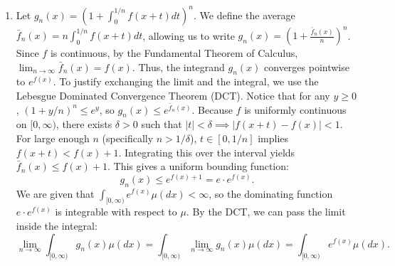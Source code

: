 \documentclass[10pt,a4paper]{article}
\begin{document}
\begin{enumerate}[label=\fbox{\arabic*}]
\begin{enumerate}[label=(\arabic*)]
          \item Now we compute the homology of $Z = Y \cup X_3 = (S^3 \times S^1) \cup (S^1 \times S^1 \times D^2)$. The intersection is $Y \cap X_3 = (X_1 \cap X_3) \cup (X_2 \cap X_3) = T^3 \cup T^3 = T^3$, matching the boundary of $X_3$.
          We apply the Mayer-Vietoris sequence for $Z = Y \cup X_3$:
          \[
            \dots \to H_k(T^3) \to H_k(S^3 \times S^1) \oplus H_k(T^2 \times D^2) \to H_k(Z) \to H_{k-1}(T^3) \to \dots
          \]
          For $k=4$: $H_4(Y) = \mathbb{Z}$ and $H_3(T^3) = \mathbb{Z}$. The generator of $H_3(T^3)$ projects to the Clifford torus times $S^1$ in $S^3 \times S^1$, which represents a trivial homology class in $S^3$ (since $H_3(T^3) \to H_3(Y)$ is zero). Thus $H_4(Z) = \mathbb{Z} \oplus \mathbb{Z} = \mathbb{Z}^2$.
          For $k=3$: $H_3(T^3) \to 0$ means we have $0 \to \mathbb{Z} \to H_3(Z) \to \mathbb{Z}^3 \xrightarrow{\psi_2} 0 \oplus \mathbb{Z}$. The map $\psi_2$ has a 2-dimensional kernel, yielding $H_3(Z) \cong \mathbb{Z} \oplus \mathbb{Z}^2 = \mathbb{Z}^3$.
          For $k=2$: $H_1(T^3) \xrightarrow{\psi_1} H_1(Y) \oplus H_1(X_3)$ maps $\mathbb{Z}^3 \to \mathbb{Z} \oplus \mathbb{Z}^2$ as an isomorphism. Hence $H_2(Z) = 0$.
          For $k=1$: Because $\psi_1$ is an isomorphism, its cokernel is trivial, giving $H_1(Z) = 0$.
          Summarizing the homology groups of $Z$:
          \[
            H_0(Z) = \mathbb{Z}, \quad H_1(Z) = 0, \quad H_2(Z) = 0, \quad H_3(Z) = \mathbb{Z}^3, \quad H_4(Z) = \mathbb{Z}^2.
          \]
        \end{enumerate}

  \item %
        Let $g_n(x) = \left( 1 + \int_0^{1/n} f(x+t) dt \right)^n$. We define the average $\bar{f}_n(x) = n \int_0^{1/n} f(x+t) dt$, allowing us to write $g_n(x) = \left( 1 + \frac{\bar{f}_n(x)}{n} \right)^n$.
        Since $f$ is continuous, by the Fundamental Theorem of Calculus, $\lim_{n \to \infty} \bar{f}_n(x) = f(x)$. Thus, the integrand $g_n(x)$ converges pointwise to $e^{f(x)}$.
        To justify exchanging the limit and the integral, we use the Lebesgue Dominated Convergence Theorem (DCT). Notice that for any $y \ge 0$, $(1 + y/n)^n \le e^y$, so $g_n(x) \le e^{\bar{f}_n(x)}$. 
        Because $f$ is uniformly continuous on $[0, \infty)$, there exists $\delta > 0$ such that $|t| < \delta \implies |f(x+t) - f(x)| < 1$. For large enough $n$ (specifically $n > 1/\delta$), $t \in [0, 1/n]$ implies $f(x+t) < f(x) + 1$. Integrating this over the interval yields $\bar{f}_n(x) \le f(x) + 1$.
        This gives a uniform bounding function:
        \[
          g_n(x) \le e^{f(x)+1} = e \cdot e^{f(x)}.
        \]
        We are given that $\int_{[0, \infty)} e^{f(x)} \mu(dx) < \infty$, so the dominating function $e \cdot e^{f(x)}$ is integrable with respect to $\mu$. By the DCT, we can pass the limit inside the integral:
        \[
          \lim_{n \to \infty} \int_{[0, \infty)} g_n(x) \mu(dx) = \int_{[0, \infty)} \lim_{n \to \infty} g_n(x) \mu(dx) = \int_{[0, \infty)} e^{f(x)} \mu(dx).
        \]


\end{enumerate}
\end{document}

